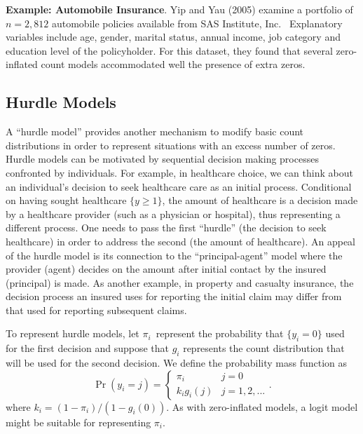 {\linejed{}

\textbf{Example: Automobile Insurance}. Yip and Yau (2005) examine a portfolio of $n=2,812$
automobile policies available from SAS Institute, Inc. \ Explanatory
variables include age, gender, marital status, annual income, job
category and education level of the policyholder. For this dataset,
they found that several zero-inflated count models accommodated well
the presence of extra zeros.

\linejed

\subsection{Hurdle Models}

A ``hurdle model'' provides another mechanism to modify basic count
distributions in order to represent situations with an excess number
of zeros. Hurdle models can be motivated by sequential decision
making processes confronted by individuals. For example, in
healthcare choice, we can think about an individual's decision to
seek healthcare care as an initial process. Conditional on having
sought healthcare $\{y\geq 1\}$, the amount of healthcare is a
decision made by a healthcare provider (such as a physician or
hospital), thus representing a different process. One needs to pass
the first ``hurdle'' (the decision to seek healthcare) in order to
address the second (the amount of healthcare). An appeal of the
hurdle model is its connection to the ``principal-agent'' model
where the provider (agent) decides on the amount after initial
contact by the insured (principal) is made. As another example, in
property and casualty insurance, the decision process an insured
uses for reporting the initial claim may differ from that used for
reporting subsequent claims.

To represent hurdle models, let $\pi_i$\ represent the probability that $%
\{y_i=0\}$ used for the first decision and suppose that $g_i$
represents the count distribution that will be used for the second
decision. We define the probability mass function as
\begin{equation} \label{E12:Hurdle}
\Pr \left( y_i=j\right) =\left\{
\begin{array}{ll}
\pi_i & j=0 \\
k_ig_i(j) & j=1,2,...%
\end{array}%
\right. .
\end{equation}%
where $k_i=(1-\pi_i)/(1-g_i(0))$. As with zero-inflated models, a
logit model might be suitable for representing $\pi_i$.

}
